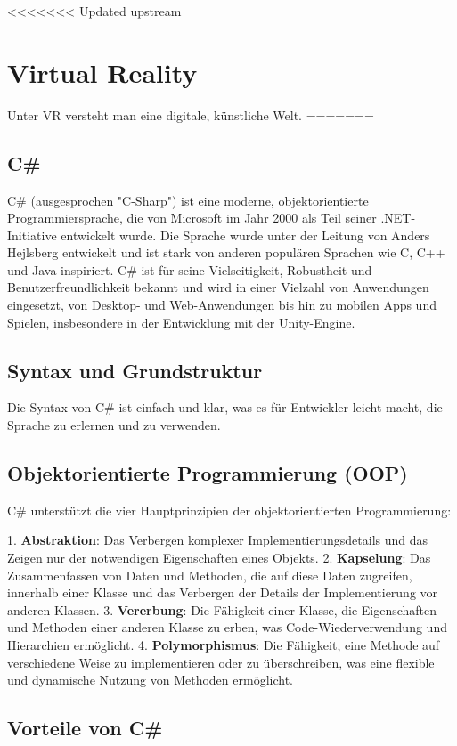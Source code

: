 <<<<<<< Updated upstream
\section{Virtual Reality}
Unter VR versteht man eine digitale, künstliche Welt.
=======
\subsection{C\#}
C\# (ausgesprochen "C-Sharp") ist eine moderne, objektorientierte Programmiersprache, die von Microsoft im Jahr 2000 als Teil seiner .NET-Initiative entwickelt wurde. Die Sprache wurde unter der Leitung von Anders Hejlsberg entwickelt und ist stark von anderen populären Sprachen wie C, C++ und Java inspiriert. C\# ist für seine Vielseitigkeit, Robustheit und Benutzerfreundlichkeit bekannt und wird in einer Vielzahl von Anwendungen eingesetzt, von Desktop- und Web-Anwendungen bis hin zu mobilen Apps und Spielen, insbesondere in der Entwicklung mit der Unity-Engine.

\subsection{Syntax und Grundstruktur}

Die Syntax von C\# ist einfach und klar, was es für Entwickler leicht macht, die Sprache zu erlernen und zu verwenden.
\subsection{Objektorientierte Programmierung (OOP)}

C\# unterstützt die vier Hauptprinzipien der objektorientierten Programmierung:

1. \textbf{Abstraktion}: Das Verbergen komplexer Implementierungsdetails und das Zeigen nur der notwendigen Eigenschaften eines Objekts.
2. \textbf{Kapselung}: Das Zusammenfassen von Daten und Methoden, die auf diese Daten zugreifen, innerhalb einer Klasse und das Verbergen der Details der Implementierung vor anderen Klassen.
3. \textbf{Vererbung}: Die Fähigkeit einer Klasse, die Eigenschaften und Methoden einer anderen Klasse zu erben, was Code-Wiederverwendung und Hierarchien ermöglicht.
4. \textbf{Polymorphismus}: Die Fähigkeit, eine Methode auf verschiedene Weise zu implementieren oder zu überschreiben, was eine flexible und dynamische Nutzung von Methoden ermöglicht.
\subsection{Vorteile von C\#}

